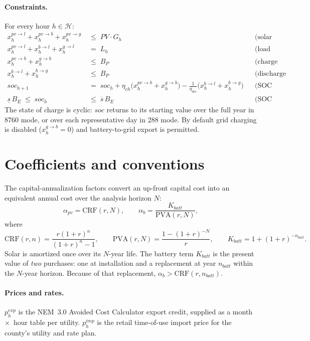 \documentclass[11pt]{article}
\begin{document}
\paragraph{Constraints.} For every hour $h\in\mathcal{H}$:
\begin{align}
x_h^{pv\to l}+x_h^{pv\to b}+x_h^{pv\to g} &\;\le\; PV\cdot G_h && \text{(solar availability)} \\
x_h^{pv\to l}+x_h^{b\to l}+x_h^{g\to l} &\;=\; L_h && \text{(load balance)} \\
x_h^{pv\to b}+x_h^{g\to b} &\;\le\; B_P && \text{(charge power)} \\
x_h^{b\to l}+x_h^{b\to g} &\;\le\; B_P && \text{(discharge power)} \\
soc_{h+1} &\;=\; soc_h + \eta_{ch}\big(x_h^{pv\to b}+x_h^{g\to b}\big)
        - \tfrac{1}{\eta_{dis}}\big(x_h^{b\to l}+x_h^{b\to g}\big) && \text{(SOC dynamics)} \\
\underline{s}\,B_E \;\le\; soc_h &\;\le\; \overline{s}\,B_E && \text{(SOC bounds)}
\end{align}
The state of charge is cyclic: $soc$ returns to its starting value over the full year in
8760 mode, or over each representative day in 288 mode. By default grid charging is
disabled ($x_h^{g\to b}=0$) and battery-to-grid export is permitted.

\section{Coefficients and conventions}
\label{sec:coef}

The capital-annualization factors convert an up-front capital cost into an equivalent
annual cost over the analysis horizon $N$:
\begin{equation}
\alpha_{pv} = \mathrm{CRF}(r,N),
\qquad
\alpha_{b} = \frac{K_{batt}}{\mathrm{PVA}(r,N)},
\end{equation}
where
\begin{equation}
\mathrm{CRF}(r,n) = \frac{r(1+r)^{n}}{(1+r)^{n}-1},
\qquad
\mathrm{PVA}(r,N) = \frac{1-(1+r)^{-N}}{r},
\qquad
K_{batt} = 1 + (1+r)^{-n_{batt}}.
\end{equation}
Solar is amortized once over its $N$-year life. The battery term $K_{batt}$ is the present
value of \emph{two} purchases: one at installation and a replacement at year $n_{batt}$
within the $N$-year horizon. Because of that replacement, $\alpha_{b} > \mathrm{CRF}(r,n_{batt})$.

\paragraph{Prices and rates.} $p_h^{exp}$ is the NEM~3.0 Avoided Cost Calculator export
credit, supplied as a month~$\times$~hour table per utility. $p_h^{imp}$ is the retail
time-of-use import price for the county's utility and rate plan.
\end{document}
